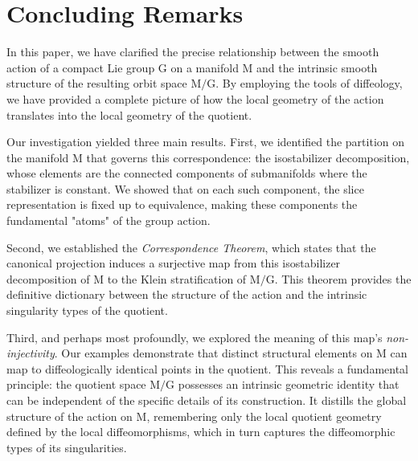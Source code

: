 \documentclass[10pt,reqno,letterpaper,twoside]{amsart}
\theoremstyle{article}
\def \G{\mathrm G}
\def \M{\mathrm M}
\begin{document}
  
  \section{Concluding Remarks}
  \label{sec:Concluding_Remarks}
  
  In this paper,
  we have clarified the precise relationship between the smooth action of a compact Lie group $\G$ on a manifold $\M$ and the intrinsic smooth structure of the resulting orbit space $\M/\G$.
  By employing the tools of diffeology,
  we have provided a complete picture of how the local geometry of the action translates into the local geometry of the quotient.
  
  Our investigation yielded three main results.
  First,
  we identified the partition on the manifold $\M$ that governs this correspondence:
  the isostabilizer decomposition,
  whose elements are the connected components of submanifolds where the stabilizer is constant.
  We showed that on each such component,
  the slice representation is fixed up to equivalence,
  making these components the fundamental "atoms" of the group action.
  
  Second,
  we established the \emph{Correspondence Theorem},
  which states that the canonical projection induces a surjective map from this isostabilizer decomposition of $\M$ to the Klein stratification of $\M/\G$.
  This theorem provides the definitive dictionary between the structure of the action and the intrinsic singularity types of the quotient.
  
  Third,
  and perhaps most profoundly,
  we explored the meaning of this map's \emph{non-injectivity}.
  Our examples demonstrate that distinct structural elements on $\M$ can map to diffeologically identical points in the quotient.
  This reveals a fundamental principle:
  the quotient space $\M/\G$ possesses an intrinsic geometric identity that can be independent of the specific details of its construction.
  It distills the global structure of the action on $\M$,
  remembering only the local quotient geometry defined by the local diffeomorphisms,
  which in turn captures the diffeomorphic types of its singularities.
  
\end{document}
